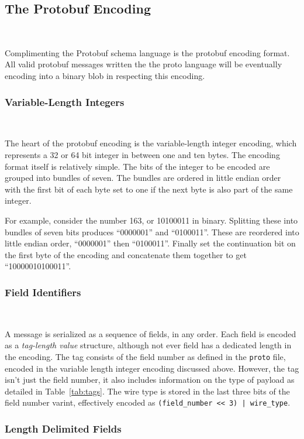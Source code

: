 \documentclass[11pt]{article}
\theoremstyle{definition}
\theoremstyle{plain}
\begin{document}
\subsection{The Protobuf Encoding}~\label{sec:proto-enc}

Complimenting the Protobuf schema language is the protobuf encoding format. All
valid protobuf messages written the the proto language will be eventually
encoding into a binary blob in respecting this encoding.

\subsubsection{Variable-Length Integers}~\label{sec:proto-vint}

The heart of the protobuf encoding is the variable-length integer encoding,
which represents a 32 or 64 bit integer in between one and ten bytes. The
encoding format itself is relatively simple. The bits of the integer to be
encoded are grouped into bundles of seven. The bundles are ordered in little
endian order with the first bit of each byte set to one if the next byte is also
part of the same integer.

For example, consider the number 163, or 10100011 in binary. Splitting these
into bundles of seven bits produces ``0000001'' and ``0100011''. These are
reordered into little endian order, ``0000001'' then ``0100011''. Finally set
the continuation bit on the first byte of the encoding and concatenate them
together to get ``10000010100011''.

\subsubsection{Field Identifiers}~\label{sec:proto-header}

A message is serialized as a sequence of fields, in any order. Each field is
encoded as a \emph{tag-length value} structure, although not ever field has a
dedicated length in the encoding. The tag consists of the field number as
defined in the \texttt{proto} file, encoded in the variable length integer
encoding discussed above. However, the tag isn't just the field number, it also
includes information on the type of payload as detailed in
Table~\ref{tab:tags}. The wire type is stored in the last three bits of the
field number varint, effectively encoded as \texttt{(field\_number << 3) |
  wire\_type}. 

\subsubsection{Length Delimited Fields}~\label{sec:proto-len}
\end{document}
